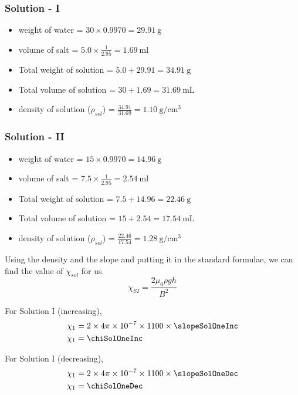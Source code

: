 \documentclass[../main.tex]{subfiles}
\begin{document}
\subsubsection*{Solution - I}
\begin{itemize}
	\item weight of water = $30 \times 0.9970 = \SI{29.91}{\gram}$
	\item volume of salt = $5.0 \times \frac{1}{2.95} = \SI{1.69}{\milli\litre}$
	\item Total weight of solution = $5.0 + 29.91 = \SI{34.91}{\gram}$
	\item Total volume of solution = $30 + 1.69 = \SI{31.69}{\milli\liter}$
	\item density of solution ($\rho_{sol}$) = $\frac{34.91}{31.69} = \underline{\SI{1.10}{\gram\per\centi\meter\cubed}}$
\end{itemize}

\subsubsection*{Solution - II}
\begin{itemize}
	\item weight of water = $15 \times 0.9970 = \SI{14.96}{\gram}$
	\item volume of salt = $7.5 \times \frac{1}{2.95} = \SI{2.54}{\milli\litre}$
	\item Total weight of solution = $7.5 + 14.96 = \SI{22.46}{\gram}$
	\item Total volume of solution = $15 + 2.54 = \SI{17.54}{\milli\liter}$
	\item density of solution ($\rho_{sol}$) = $\frac{22.46}{17.54} = \underline{\SI{1.28}{\gram\per\centi\meter\cubed}}$
\end{itemize}


Using the density and the slope and putting it in the standard formulae, we can find the value of $\chi_{sol}$ for us.
$$ \chi_{SI} = \frac{2\mu_0 \rho g h}{B^2} $$

For Solution I (increasing),
\begin{align*}
	\chi_1 &= 2 \times 4 \pi \times \SI{e-7}{} \times 1100 \times \slopeSolOneInc \\
	\chi_1 &= \chiSolOneInc
\end{align*}

For Solution I (decreasing),
\begin{align*}
	\chi_1 &= 2 \times 4 \pi \times \SI{e-7}{} \times 1100 \times \slopeSolOneDec \\
\chi_1 &= \chiSolOneDec
\end{align*}
\end{document}
